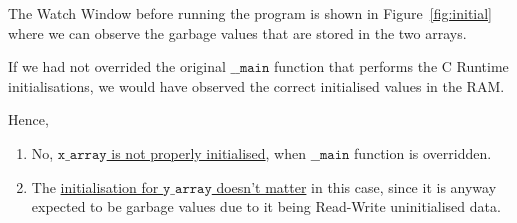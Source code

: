 The Watch Window before running the program is shown in Figure~\ref{fig:initial} where we can observe the garbage values that are stored in the two arrays.

If we had not overrided the original \( \texttt{\_\_main} \) function that performs the C Runtime initialisations, we would have observed the correct initialised values in the RAM.\@

Hence,
\begin{enumerate}[itemsep=0pt, topsep=0pt, partopsep=0pt, parsep=0pt]
    \item No, \underline{\( \texttt{x\_array} \) is not properly initialised}, when \( \texttt{\_\_main} \) function is overridden.
    \item The \underline{initialisation for \( \texttt{y\_array} \) doesn't matter} in this case, since it is anyway expected to be garbage values due to it being Read-Write uninitialised data.
\end{enumerate}
